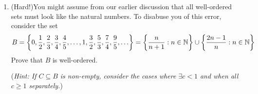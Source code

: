 \begin{exercises}
\begin{enumerate}
	
	
	\item (Hard!)\lstsp You might assume from our earlier discussion that all well-ordered sets must look like the natural numbers.	To disabuse you of this error, consider the set
	\[B=\left\{0,\frac 12,\frac 23,\frac 34,\frac 45,\ldots,1,\frac 32,\frac 53,\frac 74,\frac 95,\ldots\right\}=\left\{\frac n{n+1}:n\in\mathbb{N}\right\}\cup\left\{\frac{2n-1}{n}:n\in\mathbb{N}\right\}\]
	Prove that $B$ is well-ordered.\footnotemark\par
	(\emph{Hint: If $C\subseteq B$ is non-empty, consider the cases where $\exists c<1$ and when all $c\ge 1$ separately.})

% 

\end{enumerate}

\end{exercises}


